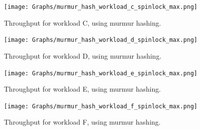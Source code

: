 \documentclass[11pt]{article} %
\begin{document}
\begin{figure}[H]
  \centering
  \texttt{[image: Graphs/murmur\_hash\_workload\_c\_spinlock\_max.png]}\\
  \caption[]{Throughput for workload C, using murmur hashing.}\label{fig:mur_c_full}
\end{figure}
\begin{figure}[H]
  \centering
  \texttt{[image: Graphs/murmur\_hash\_workload\_d\_spinlock\_max.png]}\\
  \caption[]{Throughput for workload D, using murmur hashing.}\label{fig:mur_d_full}
\end{figure}
\begin{figure}[H]
  \centering
  \texttt{[image: Graphs/murmur\_hash\_workload\_e\_spinlock\_max.png]}\\
  \caption[]{Throughput for workload E, using murmur hashing.}\label{fig:mur_e_full}
\end{figure}
\begin{figure}[H]
  \centering
  \texttt{[image: Graphs/murmur\_hash\_workload\_f\_spinlock\_max.png]}\\
  \caption[]{Throughput for workload F, using murmur hashing.}\label{fig:mur_f_full}
\end{figure}
\newpage
\end{document}
